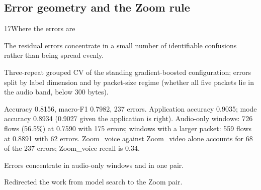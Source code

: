 \subsection{Error geometry and the Zoom rule}

 
\begin{explog}{17}{Where the errors are}
\item[Hypothesis] The residual errors concentrate in a small number of identifiable confusions
rather than being spread evenly.
\item[Method] Three-repeat grouped CV of the standing gradient-boosted configuration;
errors split by label dimension and by packet-size regime (whether all five packets
lie in the audio band, below 300 bytes).
\item[Result] Accuracy 0.8156, macro-F1 0.7982, 237 errors. Application accuracy 0.9035;
mode accuracy 0.8934 (0.9027 given the application is right). Audio-only windows:
726 flows (56.5\%) at 0.7590 with 175 errors; windows with a larger packet: 559
flows at 0.8891 with 62 errors. Zoom\_voice against Zoom\_video alone accounts for
68 of the 237 errors; Zoom\_voice recall is 0.34.
\item[Inference] Errors concentrate in audio-only windows and in one pair.
\item[Verdict] Redirected the work from model search to the Zoom pair.
\end{explog}

